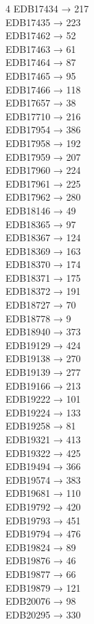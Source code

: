 \begin{multicols}{4}
EDB17434 → 217\\
EDB17435 → 223\\
EDB17462 → 52\\
EDB17463 → 61\\
EDB17464 → 87\\
EDB17465 → 95\\
EDB17466 → 118\\
EDB17657 → 38\\
EDB17710 → 216\\
EDB17954 → 386\\
EDB17958 → 192\\
EDB17959 → 207\\
EDB17960 → 224\\
EDB17961 → 225\\
EDB17962 → 280\\
EDB18146 → 49\\
EDB18365 → 97\\
EDB18367 → 124\\
EDB18369 → 163\\
EDB18370 → 174\\
EDB18371 → 175\\
EDB18372 → 191\\
EDB18727 → 70\\
EDB18778 → 9\\
EDB18940 → 373\\
EDB19129 → 424\\
EDB19138 → 270\\
EDB19139 → 277\\
EDB19166 → 213\\
EDB19222 → 101\\
EDB19224 → 133\\
EDB19258 → 81\\
EDB19321 → 413\\
EDB19322 → 425\\
EDB19494 → 366\\
EDB19574 → 383\\
EDB19681 → 110\\
EDB19792 → 420\\
EDB19793 → 451\\
EDB19794 → 476\\
EDB19824 → 89\\
EDB19876 → 46\\
EDB19877 → 66\\
EDB19879 → 121\\
EDB20076 → 98\\
EDB20295 → 330\\

\end{multicols}
